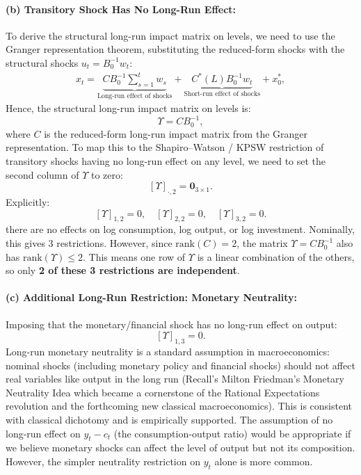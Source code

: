 \documentclass[12pt]{article}
\newcommand{\rank}{\mathrm{rank}}
\theoremstyle{definition}
\begin{document}
\paragraph{(b) Transitory Shock Has No Long-Run Effect: }
To derive the structural long-run impact matrix on levels, we need to use the Granger representation theorem, substituting the reduced-form shocks with the structural shocks $u_t = B_0^{-1} w_t$:
\begin{align*}
    x_t = \underbrace{C B_0^{-1}\sum_{s=1}^{t}  w_s}_{\text{Long-run effect of shocks}} + \underbrace{C^*(L) B_0^{-1} w_t}_{\text{Short-run effect of shocks}} + x_0^*,
\end{align*}
Hence, the structural long-run impact matrix on levels is:
\[
\Upsilon = C B_0^{-1},
\]
where $C$ is the reduced-form long-run impact matrix from the Granger representation. To map this to the Shapiro--Watson / KPSW restriction of transitory shocks having no long-run effect on any level, we need to set the second column of $\Upsilon$ to zero:
\[
[\Upsilon]_{\cdot, 2} = \mathbf{0}_{3 \times 1}.
\]
Explicitly:
\[
\boxed{[\Upsilon]_{1,2} = 0, \quad [\Upsilon]_{2,2} = 0, \quad [\Upsilon]_{3,2} = 0.}
\]
there are no effects on log consumption, log output, or log investment. Nominally, this gives 3 restrictions. However, since $\rank(C) = 2$, the matrix $\Upsilon = C B_0^{-1}$ also has $\rank(\Upsilon) \leq 2$. This means one row of $\Upsilon$ is a linear combination of the others, so only \textbf{2 of these 3 restrictions are independent}.

\paragraph{(c) Additional Long-Run Restriction: Monetary Neutrality: }
Imposing that the monetary/financial shock has no long-run effect on output:
\[
\boxed{[\Upsilon]_{1,3} = 0.}
\]
Long-run monetary neutrality is a standard assumption in macroeconomics: nominal shocks (including monetary policy and financial shocks) should not affect real variables like output in the long run (Recall's Milton Friedman's Monetary Neutrality Idea which became a cornerstone of the Rational Expectations revolution and the forthcoming new classical macroeconomics). This is consistent with classical dichotomy and is empirically supported. The assumption of  no long-run effect on $y_t - c_t$ (the consumption-output ratio) would be appropriate if we believe monetary shocks can affect the level of output but not its composition. However, the simpler neutrality restriction on $y_t$ alone is more common.
\end{document}
